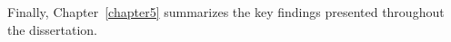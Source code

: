 Finally, Chapter~\ref{chapter5} summarizes the key findings presented throughout the dissertation.



%
%
%
%
%
%
%
%
%

